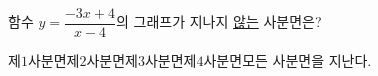함수 $y=\dfrac{-3x+4}{x-4}$의 그래프가 지나지 \underline{않는} 사분면은?
\begin{choicesii}{제$1$사분면}{제$2$사분면}{제$3$사분면}{제$4$사분면}{모든 사분면을 지난다.}\end{choicesii}
